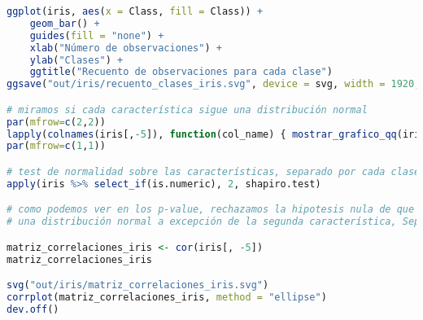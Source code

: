 \begin{lstlisting}[language=R]
ggplot(iris, aes(x = Class, fill = Class)) +
	geom_bar() +
	guides(fill = "none") +
	xlab("Número de observaciones") +
	ylab("Clases") +
	ggtitle("Recuento de observaciones para cada clase")
ggsave("out/iris/recuento_clases_iris.svg", device = svg, width = 1920, height = 1080, units = "px", dpi = 150)

# miramos si cada característica sigue una distribución normal
par(mfrow=c(2,2))
lapply(colnames(iris[,-5]), function(col_name) { mostrar_grafico_qq(iris[,col_name], col_name, save_plot = TRUE) } )
par(mfrow=c(1,1))

# test de normalidad sobre las características, separado por cada clase
apply(iris %>% select_if(is.numeric), 2, shapiro.test)

# como podemos ver en los p-value, rechazamos la hipotesis nula de que los datos siguen
# una distribución normal a excepción de la segunda característica, SepalWidth ,por muy poco

matriz_correlaciones_iris <- cor(iris[, -5])
matriz_correlaciones_iris

svg("out/iris/matriz_correlaciones_iris.svg")
corrplot(matriz_correlaciones_iris, method = "ellipse")
dev.off()
\end{lstlisting}

\newpage
